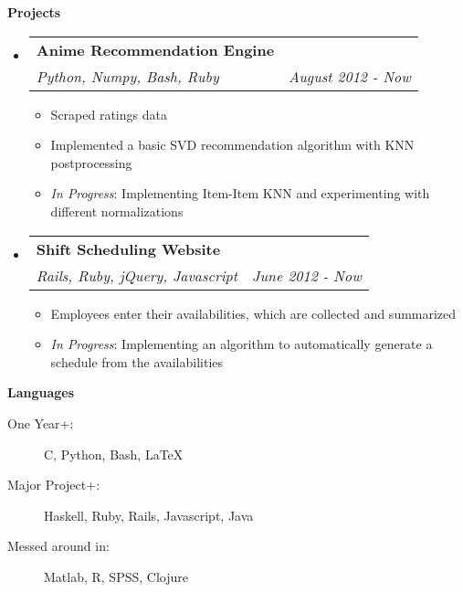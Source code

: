 \documentclass[letterpaper,11pt]{article}
\makeatletter
\newcommand{\resitem}[1]{\item #1 \vspace{-2pt}}
\newcommand{\resheading}[1]{{\large {\textbf{#1 \vphantom{p\^{E}}}}}}
\newcommand{\ressubheading}[4]{
\begin{tabular*}{6.5in}{l@{\extracolsep{\fill}}r}
		\textbf{#1} & #2 \\
			    \textit{#3} & \textit{#4} \\
\end{tabular*}\vspace{-6pt}}
\makeatother
\begin{document}
\resheading{Projects}
\begin{itemize}
\item[]
	\ressubheading{Anime Recommendation Engine}{}{Python, Numpy, Bash, Ruby}{August 2012 - Now}
	\begin{itemize}
		\resitem{Scraped ratings data}
				\resitem{Implemented a basic SVD recommendation algorithm with KNN postprocessing}
						  \resitem{\textit{In Progress}: Implementing Item-Item KNN and experimenting with different normalizations}
								       \end{itemize}

\item[]
	\ressubheading{Shift Scheduling Website}{}{Rails, Ruby, jQuery, Javascript}{June 2012 - Now}
	\begin{itemize}
		\resitem{Employees enter their availabilities, which are collected and summarized}
				  \resitem{\textit{In Progress}: Implementing an algorithm to automatically generate a schedule from the availabilities}
				  \end{itemize}

\end{itemize}

\resheading{Languages}

\begin{description}
\item[One Year+:]
C, Python, Bash, \LaTeX
\item[Major Project+:]
Haskell, Ruby, Rails, Javascript, Java
\item[Messed around in:]
Matlab, R, SPSS, Clojure
\end{description}
\end{document}
